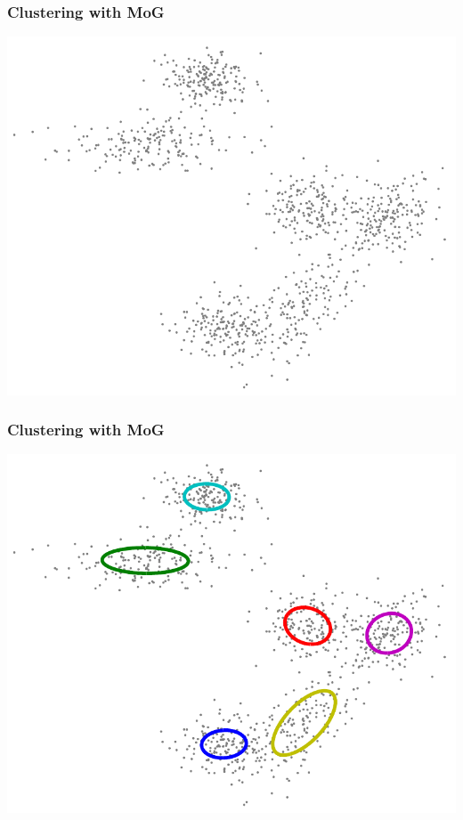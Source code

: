 \documentclass[10pt]{beamer}
\begin{document}
\begin{frame}
\frametitle{Clustering with MoG}

\centerline{\includegraphics[height=0.85\textheight]{mog-cluster-data}}
\end{frame}

\begin{frame}
\frametitle{Clustering with MoG}

\centerline{\includegraphics[height=0.85\textheight]{mog-cluster-ellipses}}
\end{frame}
\end{document}
